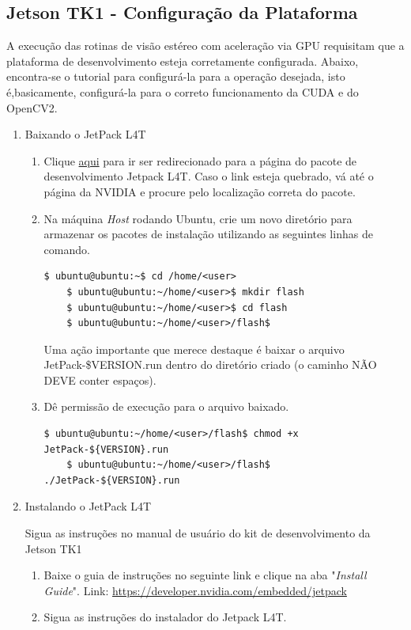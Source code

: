 \subsection{Jetson TK1 - Configuração da Plataforma}

A execução das rotinas de visão estéreo com aceleração via GPU requisitam que a plataforma de desenvolvimento esteja corretamente configurada. Abaixo, encontra-se o tutorial para configurá-la para a operação desejada, isto é,basicamente, configurá-la para o correto funcionamento da CUDA e do OpenCV2. 

\begin{enumerate}
  \item Baixando o JetPack L4T
    \begin{enumerate}
      \item Clique \href{http://docs.nvidia.com/jetpack-l4t/index.html#developertools/mobile/jetpack/jetpack_l4t/2.1/jetpack_l4t_install.htm}{aqui} para ir ser redirecionado para a página do pacote de desenvolvimento Jetpack L4T. Caso o link esteja quebrado, vá até o página da NVIDIA e procure pelo localização correta do pacote.  

      \item Na máquina \textit{Host} rodando Ubuntu, crie um novo diretório para armazenar os pacotes de instalação utilizando as seguintes linhas de comando.
      \begin{lstlisting}[basicstyle=\tiny]
	$ ubuntu@ubuntu:~$ cd /home/<user>
	$ ubuntu@ubuntu:~/home/<user>$ mkdir flash
	$ ubuntu@ubuntu:~/home/<user>$ cd flash
	$ ubuntu@ubuntu:~/home/<user>/flash$ 
      \end{lstlisting}
      Uma ação importante que merece destaque é baixar o arquivo JetPack-\${VERSION}.run dentro do diretório criado (o caminho NÃO DEVE conter espaços).
      
      \item Dê permissão de execução para o arquivo baixado. 
      \begin{lstlisting}[basicstyle=\tiny]
	$ ubuntu@ubuntu:~/home/<user>/flash$ chmod +x JetPack-${VERSION}.run
	$ ubuntu@ubuntu:~/home/<user>/flash$ ./JetPack-${VERSION}.run
      \end{lstlisting}
      
      
    \end{enumerate}
  \item Instalando o JetPack L4T
  
    Sigua as instruções no manual de usuário do kit de desenvolvimento da Jetson TK1
    \begin{enumerate}
      \item Baixe o guia de instruções no seguinte link e clique na aba "\textit{Install Guide}". Link: \url{https://developer.nvidia.com/embedded/jetpack}
      \item Sigua as instruções do instalador do Jetpack L4T.
     

\end{enumerate}
\end{enumerate}
